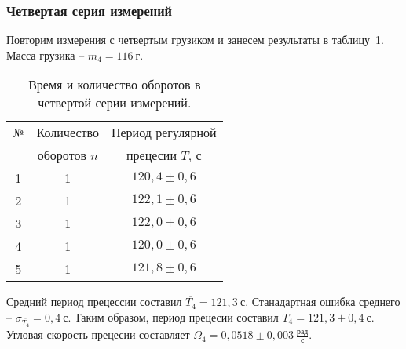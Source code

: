 \documentclass[a4paper,11pt]{article}
\begin{document}
\subsubsection{Четвертая серия измерений} %
Повторим измерения с четвертым грузиком и занесем результаты в таблицу~\ref{table:tab4}.\newline
Масса грузика -- $m_{4} = 116\ г$.
\begin{table}[h!]
\centering
\begin{tabular}{ ||c|c|c|| }
  \hline
  № & Количество & Период регулярной \\
   & оборотов $n$ & прецесии $T$, $с$ \\
  \hline
  1 & 1 & $120,4 \pm 0,6$ \\
  2 & 1 & $122,1 \pm 0,6$ \\
  3 & 1 & $122,0 \pm 0,6$ \\
  4 & 1 & $120,0 \pm 0,6$ \\
  5 & 1 & $121,8 \pm 0,6$ \\
  \hline
\end{tabular}
\caption{Время и количество оборотов в четвертой серии измерений.}
\label{table:tab4}
\end{table}\newline
Средний период прецессии составил $\overline{T_{4}} = 121,3\ с$.\newline
Станадартная ошибка среднего -- $\sigma_{\overline{T_{4}}}= 0,4\ с$.\newline
Таким образом, период прецесии составил $T_{4} = 121,3 \pm 0,4\ с$.\newline
Угловая скорость прецесии составляет $\Omega_{4} = 0,0518 \pm 0,003\ \frac{рад}{с}$.
\end{document}
